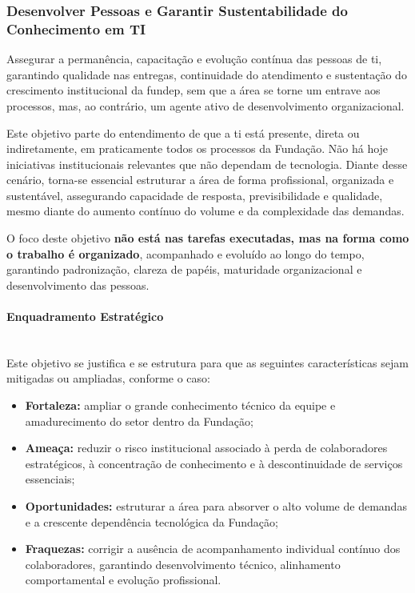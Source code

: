\documentclass[12pt,a4paper]{article}
\begin{document}
\subsubsection{Desenvolver Pessoas e Garantir Sustentabilidade do Conhecimento em TI}

Assegurar a permanência, capacitação e evolução contínua das pessoas de \gls{ti}, garantindo qualidade nas entregas, continuidade do atendimento e sustentação do crescimento institucional da \gls{fundep}, sem que a área se torne um entrave aos processos, mas, ao contrário, um agente ativo de desenvolvimento organizacional.

Este objetivo parte do entendimento de que a \gls{ti} está presente, direta ou indiretamente, em praticamente todos os processos da Fundação. Não há hoje iniciativas institucionais relevantes que não dependam de tecnologia. Diante desse cenário, torna-se essencial estruturar a área de forma profissional, organizada e sustentável, assegurando capacidade de resposta, previsibilidade e qualidade, mesmo diante do aumento contínuo do volume e da complexidade das demandas.

O foco deste objetivo \textbf{não está nas tarefas executadas, mas na forma como o trabalho é organizado}, acompanhado e evoluído ao longo do tempo, garantindo padronização, clareza de papéis, maturidade organizacional e desenvolvimento das pessoas.

\paragraph{Enquadramento Estratégico}\mbox{}\\

Este objetivo se justifica e se estrutura para que as seguintes características sejam mitigadas ou ampliadas, conforme o caso:

\begin{itemize}
  \item \textbf{Fortaleza:} ampliar o grande conhecimento técnico da equipe e amadurecimento do setor dentro da Fundação;
  \item \textbf{Ameaça:} reduzir o risco institucional associado à perda de colaboradores estratégicos, à concentração de conhecimento e à descontinuidade de serviços essenciais;
  \item \textbf{Oportunidades:} estruturar a área para absorver o alto volume de demandas e a crescente dependência tecnológica da Fundação;
  \item \textbf{Fraquezas:} corrigir a ausência de acompanhamento individual contínuo dos colaboradores, garantindo desenvolvimento técnico, alinhamento comportamental e evolução profissional.
\end{itemize}
\end{document}
